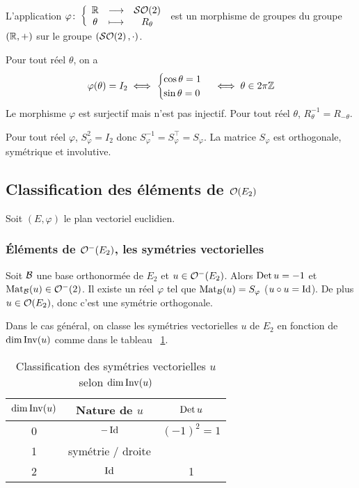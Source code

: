 \begin{corth}
  L'application \(\varphi\colon \left\{\begin{array}{ccc} \mathbb{R} & \longrightarrow &\mathcal{SO}\!\left(2\right)\\ \theta & \longmapsto & R_\theta \end{array} \right.\) est 
  un morphisme de groupes du groupe \((\mathbb{R},+)\) sur le groupe 
  \((\mathcal{SO}\!\left(2\right),\cdot)\).
\end{corth}
Pour tout réel \(\theta\), on a
\begin{equation}
  \varphi(\theta)=I_2 \iff \begin{cases} \cos\theta =1 \\ 
  \sin\theta=0\end{cases} \iff \theta \in 2\pi\mathbb{Z}
\end{equation}
Le morphisme \(\varphi\) est surjectif mais n'est pas injectif. Pour tout 
réel \(\theta\), \(R_\theta^{-1} = R_{-\theta}\).

\begin{corth}
  Pour tout réel \(\varphi\), \(S_\varphi^2=I_2\) donc 
  \(S_\varphi^{-1}=S_\varphi^\top=S_\varphi\). La matrice \(S_\varphi\) est 
  orthogonale, symétrique et involutive.
\end{corth}

\subsection{Classification des éléments de \(\mathcal{O}\!\left(E_2\right)\)}

Soit \((E,\varphi)\) le plan vectoriel euclidien.

\subsubsection{Éléments de \(\mathcal{O}^{-}\!\left(E_2\right)\), les symétries vectorielles}

Soit \(\mathcal{B}\) une base orthonormée de \(E_2\) et \(u \in \mathcal{O}^{-}\!\left(E_2\right)\). 
Alors \(\operatorname{Det} u=-1\) et \(\mathrm{Mat}_{\mathcal{B}}(u) \in \mathcal{O}^{-}\!\left(2\right)\). Il existe un réel 
\(\varphi\) tel que \(\mathrm{Mat}_{\mathcal{B}}(u)=S_\varphi\) (\(u \circ u=\operatorname{Id}\)). De plus 
\(u \in \mathcal{O}\!\left(E_2\right)\), donc c'est une symétrie orthogonale. 

Dans le cas général, on classe les symétries vectorielles \(u\) de \(E_2\) 
en fonction de \(\operatorname{dim} \operatorname{Inv}(u)\) comme dans le tableau~
\ref{tab:SymVect}.

\begin{table}[!h]
  \centering
  \begin{tabular}{|c|c|c|}\hline
    \(\operatorname{dim}\operatorname{Inv}(u)\) & Nature de \(u\) & \(\operatorname{Det} u\) \\ \hline
    0 & \(-\operatorname{Id}\) & \((-1)^2=1\) \\
    1 & symétrie / droite & \\
    2 & \(\operatorname{Id}\) & 1 \\
    \hline
  \end{tabular}
  \caption{Classification des symétries vectorielles \(u\) selon 
  \(\operatorname{dim}\operatorname{Inv}(u)\)}
  \label{tab:SymVect}
\end{table}

